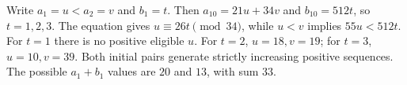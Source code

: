 Write $a_1=u<a_2=v$ and $b_1=t$. Then $a_{10}=21u+34v$ and $b_{10}=512t$, so $t=1,2,3$. The equation gives $u\equiv26t\pmod{34}$, while $u<v$ implies $55u<512t$. For $t=1$ there is no positive eligible $u$. For $t=2$, $u=18,v=19$; for $t=3$, $u=10,v=39$. Both initial pairs generate strictly increasing positive sequences. The possible $a_1+b_1$ values are $20$ and $13$, with sum $\boxed{33}$.
